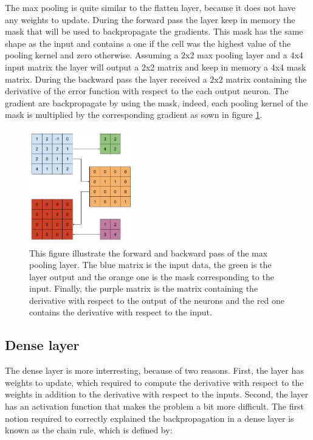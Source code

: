 \documentclass[11pt]{report}
\begin{document}
The max pooling is quite similar to the flatten layer, because it does not have any weights to update. During the forward pass the layer keep in memory the mask that will be used to backpropagate the gradients. This mask has the same shape as the input and contains a one if the cell was the highest value of the pooling kernel and zero otherwise. Assuming a 2x2 max pooling layer and a 4x4 input matrix the layer will output a 2x2 matrix and keep in memory a 4x4 mask matrix. During the backward pass the layer received a 2x2 matrix containing the derivative of the error function with respect to the each output neuron. The gradient are backpropagate by using the mask, indeed, each pooling kernel of the mask is multiplied by the corresponding gradient as sown in figure \ref{fig:max_pooling_bp}.

\begin{figure}[h]
\centering
\includegraphics[width=4.5cm, height=5cm]{max_pooling_bp}
\caption{This figure illustrate the forward and backward pass of the max pooling layer. The blue matrix is the input data, the green is the layer output and the orange one is the mask corresponding to the input. Finally, the purple matrix is the matrix containing the derivative with respect to the output of the neurons and the red one contains the derivative with respect to the input.}
\label{fig:max_pooling_bp}
\end{figure}

\subsection{Dense layer}

The dense layer is more interresting, because of two reasons. First, the layer has weights to update, which required to compute the derivative with respect to the weights in addition to the derivative with respect to the inputs. Second, the layer has an activation function that makes the problem a bit more difficult. The first notion required to correctly explained the backpropagation in a dense layer is known as the chain rule, which is defined by:
\end{document}
